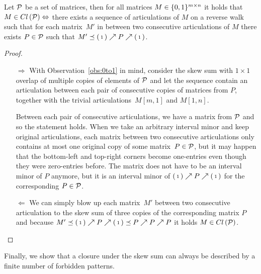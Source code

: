 \begin{lemma}
\label{lemma:artic}
Let $\mathcal{P}$ be a set of matrices, then for all matrices $M\in\{0,1\}^{m\times n}$ it holds that $M\in Cl\left(\mathcal{P}\right)\Leftrightarrow$ there exists a sequence of articulations of $M$ on a reverse walk such that for each matrix~$M'$ in between two consecutive articulations of $M$ there exists $P\in\mathcal{P}$ such that $M'\preceq\left(\begin{smallmatrix}1\end{smallmatrix}\right)\nearrow P\nearrow\left(\begin{smallmatrix}1\end{smallmatrix}\right)$.
\end{lemma}
\begin{proof}
\begin{itemize}
	\item[$\Rightarrow$] With Observation~\ref{obs:0to1} in mind, consider the skew sum with $1\times1$ overlap of multiple copies of elements of $\mathcal{P}$ and let the sequence contain an articulation between each pair of consecutive copies of matrices from $P$, together with the trivial articulations~$M[m,1]$ and $M[1,n]$.
	
	Between each pair of consecutive articulations, we have a matrix from $\mathcal{P}$ and so the statement holds. When we take an arbitrary interval minor and keep original articulations, each matrix between two consecutive articulations only contains at most one original copy of some matrix~$P\in\mathcal{P}$, but it may happen that the bottom-left and top-right corners become one-entries even though they were zero-entries before. The matrix does not have to be an interval minor of $P$ anymore, but it is an interval minor of $\left(\begin{smallmatrix}1\end{smallmatrix}\right)\nearrow P\nearrow\left(\begin{smallmatrix}1\end{smallmatrix}\right)$ for the corresponding $P\in\mathcal{P}$.
	\item[$\Leftarrow$] We can simply blow up each matrix~$M'$ between two consecutive articulation to the skew sum of three copies of the corresponding matrix $P$ and because $M'\preceq\left(\begin{smallmatrix}1\end{smallmatrix}\right)\nearrow P\nearrow\left(\begin{smallmatrix}1\end{smallmatrix}\right)\preceq P\nearrow P\nearrow P$ it holds $M\in Cl\left(\mathcal{P}\right)$. \qedhere
\end{itemize}
\end{proof}

Finally, we show that a closure under the skew sum can always be described by a finite number of forbidden patterns.

